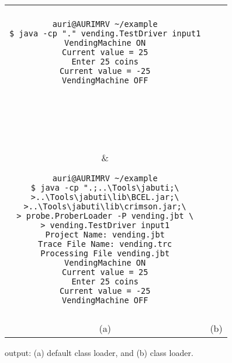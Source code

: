 
\begin{figure}[!ht]
\begin{center}\cmdsize
\begin{tabular}{|c|c|}\hline
&\\
\begin{minipage}{2.7in}
\begin{verbatim}
auri@AURIMRV ~/example
$ java -cp "." vending.TestDriver input1
VendingMachine ON
Current value = 25
Enter 25 coins
Current value = -25
VendingMachine OFF







\end{verbatim}
\end{minipage}
&
\begin{minipage}{3.6in}
\begin{verbatim}
auri@AURIMRV ~/example
$ java -cp ".;..\Tools\jabuti;\
>..\Tools\jabuti\lib\BCEL.jar;\
>..\Tools\jabuti\lib\crimson.jar;\
> probe.ProberLoader -P vending.jbt \
> vending.TestDriver input1
Project Name: vending.jbt
Trace File Name: vending.trc
Processing File vending.jbt
VendingMachine ON
Current value = 25
Enter 25 coins
Current value = -25
VendingMachine OFF
\end{verbatim}
\end{minipage}\\
&\\\hline
\multicolumn{1}{c}{(a)} & \multicolumn{1}{c}{(b)}\\
\end{tabular}
\end{center}
\caption{ output: (a) default class loader, and (b)
\toolname class loader.}\label{fig:driver-output}
\end{figure}
